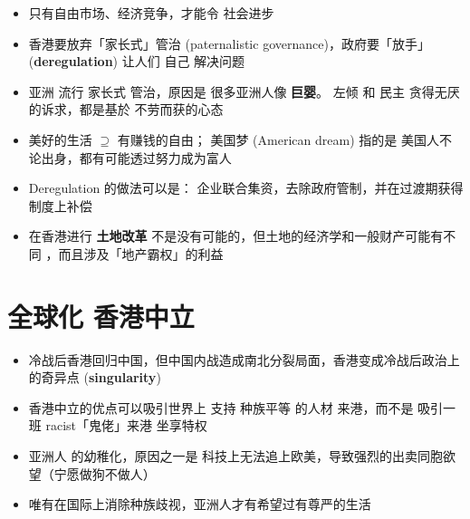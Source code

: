 \begin{itemize}
	\item 只有自由市场、经济竞争，才能令 社会进步
	\item 香港要放弃「家长式」管治 (paternalistic governance)，政府要「放手」(\textbf{deregulation}) 让人们 自己 解决问题
	\item 亚洲 流行 家长式 管治，原因是 很多亚洲人像 \textbf{巨婴}。 左倾 和 民主 贪得无厌的诉求，都是基於 不劳而获的心态
	\item 美好的生活 $\supseteq$ 有赚钱的自由； 美国梦 (American dream) 指的是 美国人不论出身，都有可能透过努力成为富人
	\item Deregulation 的做法可以是： 企业联合集资，去除政府管制，并在过渡期获得制度上补偿
	\item 在香港进行 \textbf{土地改革} 不是没有可能的，但土地的经济学和一般财产可能有不同 \cite{Ryan-Collins2017} \cite{Farvacque-Vitkoviac1992} \cite{Blomley2004} \cite{Linklater2013} \cite{Adams2015}，而且涉及「地产霸权」的利益
\end{itemize}

\section{全球化 \textbullet 香港中立}

\begin{itemize}
	\item 冷战后香港回归中国，但中国内战造成南北分裂局面，香港变成冷战后政治上的奇异点 (\textbf{singularity})
	\item 香港中立的优点可以吸引世界上 支持 种族平等 的人材 来港，而不是 吸引一班 racist「鬼佬」来港 坐享特权
	\item 亚洲人 的幼稚化，原因之一是 科技上无法追上欧美，导致强烈的出卖同胞欲望（宁愿做狗不做人）
	\item 唯有在国际上消除种族歧视，亚洲人才有希望过有尊严的生活
\end{itemize}

\printbibliography

